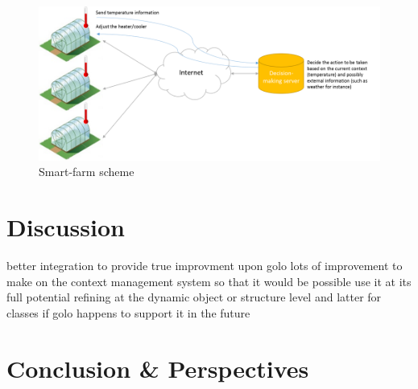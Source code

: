 \documentclass[a4paper]{article}
\begin{document}
\begin{center}
\begin{figure}
\centering
\includegraphics[width=0.9\columnwidth]{images/smart_farm.png}
\caption{Smart-farm scheme}
\label{figure:smartfarm}
\end{figure}
\end{center}


\section{Discussion}
\label{section:discussion}

better integration to provide true improvment upon golo
lots of improvement to make on the context management system so that it would be possible use it at its full potential
refining at the dynamic object or structure level and latter for classes if golo happens to support it in the future

\section{Conclusion \& Perspectives}
\label{section:conclusion}


%
%
\goodbreak


\end{document}
